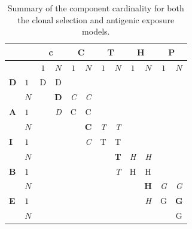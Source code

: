 \begin{table}[htp]
	\centering\small
		\begin{tabular}{llcccccccccc}
		\toprule
		 &  & \multicolumn{2}{c}{\textbf{c}} & \multicolumn{2}{c}{\textbf{C}} & \multicolumn{2}{c}{\textbf{T}} & \multicolumn{2}{c}{\textbf{H}} & \multicolumn{2}{c}{\textbf{P}} \\ 
		\toprule
		 &  		 &    $1$ & $N$ & $1$ & $N$ & $1$ & $N$ & $1$ & $N$ & $1$ & $N$ \\ 
		\midrule
		\textbf{D} & $1$ & D & D &   &   &   &   &   &   &   &  \\ 
		 				 & $N$ &   & \textbf{D} & \emph{C} & \emph{C} &   &   &   &   &   &  \\ 
		\midrule
		\textbf{A} & $1$ & 	 & \emph{D} & C & C &  &   &   &   &   &   \\ 
		 				 & $N$ & 	 &   &   & \textbf{C} & \emph{T} & \emph{T}  &   &   &   &   \\ 
		\midrule
		\textbf{I} & $1$ &   &   &   & \emph{C} & T & T &   &   &   &   \\ 
		 				 & $N$ &   &   &   &   &   & \textbf{T} & \emph{H} & \emph{H}  &   &   \\ 
		\midrule
		\textbf{B} & $1$ &   &   &   &   &   & \emph{T} & H & H &   &   \\ 
		 				 & $N$ &   &   &   &   &   &   &   & \textbf{H} & \emph{G} & \emph{G}  \\ 
		\midrule
		\textbf{E} & $1$ &   &   &   &   &   &   &   & \emph{H} & G & \textbf{G} \\ 
		 				 & $N$ &   &   &   &   &   &   &   &   &   & G \\ 
		\bottomrule
		\end{tabular}
	\caption{Summary of the component cardinality for both the clonal selection and antigenic exposure models.}
	\label{tab:framework:ihcsf:cardinality}
\end{table}

